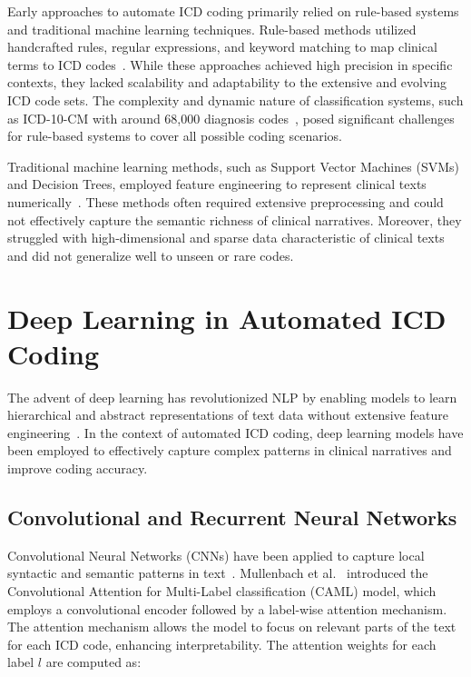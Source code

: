 \documentclass[12pt,a4paper]{report}
\begin{document}
Early approaches to automate ICD coding primarily relied on rule-based systems and traditional machine learning techniques. Rule-based methods utilized handcrafted rules, regular expressions, and keyword matching to map clinical terms to ICD codes~\cite{farkas2008automatic, scheurwegs2017data}. While these approaches achieved high precision in specific contexts, they lacked scalability and adaptability to the extensive and evolving ICD code sets. The complexity and dynamic nature of classification systems, such as ICD-10-CM with around 68,000 diagnosis codes~\cite{dong2022automated}, posed significant challenges for rule-based systems to cover all possible coding scenarios.

Traditional machine learning methods, such as Support Vector Machines (SVMs) and Decision Trees, employed feature engineering to represent clinical texts numerically~\cite{perotte2014diagnosis}. These methods often required extensive preprocessing and could not effectively capture the semantic richness of clinical narratives. Moreover, they struggled with high-dimensional and sparse data characteristic of clinical texts and did not generalize well to unseen or rare codes.

\section{Deep Learning in Automated ICD Coding}

The advent of deep learning has revolutionized NLP by enabling models to learn hierarchical and abstract representations of text data without extensive feature engineering~\cite{lecun2015deep}. In the context of automated ICD coding, deep learning models have been employed to effectively capture complex patterns in clinical narratives and improve coding accuracy.

\subsection{Convolutional and Recurrent Neural Networks}

Convolutional Neural Networks (CNNs) have been applied to capture local syntactic and semantic patterns in text~\cite{kim2014convolutional}. Mullenbach et al.~\cite{mullenbach2018explainable} introduced the Convolutional Attention for Multi-Label classification (CAML) model, which employs a convolutional encoder followed by a label-wise attention mechanism. The attention mechanism allows the model to focus on relevant parts of the text for each ICD code, enhancing interpretability. The attention weights for each label $l$ are computed as:
\end{document}
